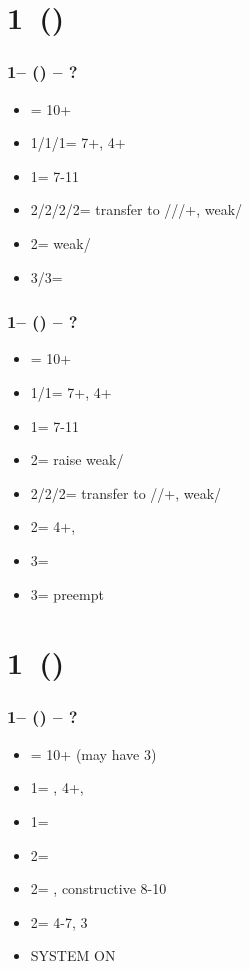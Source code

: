 \section{\texorpdfstring{1\minor\ (\dbl)}{1mX}}\label{sec:1mX}

\subsubsection*{1\clubs -- (\dbl) -- ?}
\begin{itemize}
    \item \rdbl = 10+
    \item 1\diams/1\hearts/1\spades = 7+\hcp, 4+
    \item 1\nt = 7-11
    \item 2\clubs/2\diams/2\hearts/2\spades = transfer to \diams/\hearts/\spades/+, weak/\gf
    \item 2\nt = \minor weak/\gf
    \item 3\clubs/3\diams = \inv
\end{itemize}

\subsubsection*{1\diams -- (\dbl) -- ?}
\begin{itemize}
    \item \rdbl = 10+
    \item 1\hearts/1\spades = 7+\hcp, 4+
    \item 1\nt = 7-11
    \item 2\clubs = \diams raise weak/\gf
    \item 2\diams/2\hearts/2\spades = transfer to \hearts/\spades/+, weak/\gf
    \item 2\nt = 4+\diams, \invp
    \item 3\clubs = \inv
    \item 3\diams = preempt
\end{itemize}

\section{\texorpdfstring{1\major\ (\dbl)}{transfers1MX_KacperVersion}}\label{sec:transfers1MX_KacperVersion}

\subsubsection*{1\hearts -- (\dbl) -- ?}
\begin{itemize}
    \item \rdbl = 10+ (may have 3\hearts)
    \item 1\spades = \nat, 4+\spades, \fonce
    \item 1\nt = \trsf{2\clubs}
    \item 2\clubs = \trsf{2\diams}
    \item 2\diams = \trsf{2\hearts}, constructive 8-10
    \item 2\hearts = 4-7, 3\hearts
    \item \small{SYSTEM ON}
\end{itemize}


